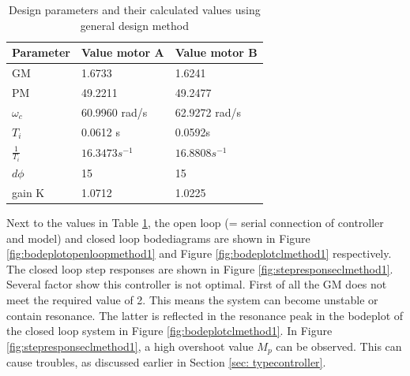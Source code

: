 \documentclass[a4paper,kul]{kulakarticle} %
\begin{document}
\begin{table}[htp!]
	
	\centering
	
	\begin{tabular}{|l|l|l|}
		\hline
		Parameter                & Value motor A & Value motor B                       \\ \hline
		GM                       & 1.6733 &        1.6241                \\
		PM                       & 49.2211\degree & 49.2477\degree \\
		$\omega_c$ & 60.9960 rad/s              &  62.9272 rad/s\\
		$T_i $                    & 0.0612 s    &     0.0592s           \\
		$\frac{1}{T_i}$                    & $16.3473 s^{-1}$  &  $16.8808s^{-1}$                  \\
		$d\phi$             & 15\degree    & 15\degree \\
		gain K 	 		& 1.0712  & 1.0225 \\  \hline
	\end{tabular}
	\caption{Design parameters and their calculated values using general design method}
	\label{tab:values}
\end{table}
\noindent Next to the values in Table \ref{tab:values}, the open loop (= serial connection of controller and model) and closed loop bodediagrams are shown in Figure \ref{fig:bodeplotopenloopmethod1} and Figure \ref{fig:bodeplotclmethod1} respectively. The closed loop step responses are shown in Figure \ref{fig:stepresponseclmethod1}. Several factor show this controller is not optimal. First of all the GM does not meet the required value of 2. This means the system can become unstable or contain resonance. The latter is reflected in the resonance peak in the bodeplot of the closed loop system in Figure \ref{fig:bodeplotclmethod1}. In Figure \ref{fig:stepresponseclmethod1}, a high overshoot value $M_p$ can be observed. This can cause troubles, as discussed earlier in Section \ref{sec: typecontroller}. 
\end{document}
